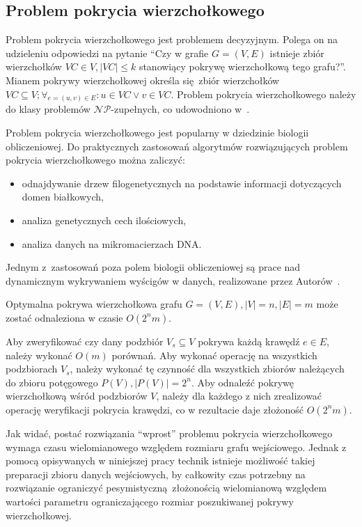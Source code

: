 \subsection{Problem pokrycia wierzchołkowego}\label{s_vertex_cover_domain}
\par{
  Problem pokrycia wierzchołkowego jest problemem decyzyjnym.
  Polega on na udzieleniu odpowiedzi na pytanie ``Czy w grafie $G=(V,E)$
  istnieje zbiór wierzchołków $VC \in V, |VC| \leq k$ stanowiący pokrywę 
  wierzchołkową tego grafu?''.
  Mianem pokrywy wierzchołkowej określa się zbiór wierzchołków $VC
  \subseteq V; \forall_{e=(u,v) \in E}:u\in VC\lor v\in VC$.
  Problem pokrycia wierzchołkowego należy do klasy problemów 
  $\mathcal{NP}$-zupełnych, co udowodniono w~\cite{Kar72}.
}
\par{
  Problem pokrycia wierzchołkowego jest popularny w dziedzinie biologii
  obliczeniowej. 
  Do praktycznych zastosowań algorytmów rozwiązujących problem pokrycia
  wierzchołkowego można zaliczyć:
  \begin{itemize}
    \item odnajdywanie drzew filogenetycznych na podstawie informacji
      dotyczących domen białkowych,
    \item analiza genetycznych cech ilościowych,
    \item analiza danych na mikromacierzach DNA.\@
  \end{itemize}

  Jednym z~zastosowań poza polem biologii obliczeniowej są prace nad dynamicznym
  wykrywaniem wyścigów w danych, realizowane przez 
  Autorów~\cite{O'Callahan:2003:HDD:781498.781528}.
}
\begin{theorem}
  Optymalna pokrywa wierzchołkowa grafu $G=(V,E), |V|=n, |E|=m$ może zostać 
  odnaleziona w czasie $O(2^{n}m)$.
\end{theorem}
\begin{bproof}
  Aby zweryfikować czy dany podzbiór $V_s \subseteq V$ pokrywa każdą krawędź
  $e \in E$, należy wykonać $O(m)$ porównań.
  Aby wykonać operację na wszystkich podzbiorach $V_s$, należy wykonać tę
  czynność dla wszystkich zbiorów należących do zbioru potęgowego 
  $P(V), |P(V)| = 2^{n}$.
  Aby odnaleźć pokrywę wierzchołkową wśród podzbiorów $V$, należy dla każdego z
  nich zrealizować operację weryfikacji pokrycia krawędzi, co w rezultacie daje 
  złożoność $O(2^{n}m)$.
\end{bproof}
\par{
  Jak widać, postać rozwiązania ``wprost'' problemu pokrycia wierzchołkowego
  wymaga czasu wielomianowego względem rozmiaru grafu wejściowego.
  Jednak z pomocą opisywanych w niniejszej pracy technik istnieje możliwość
  takiej preparacji zbioru danych wejściowych, by całkowity czas potrzebny na
  rozwiązanie ograniczyć pesymistyczną~złożonością wielomianową względem
  wartości parametru ograniczającego rozmiar poszukiwanej pokrywy
  wierzchołkowej.
}
